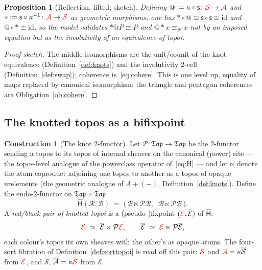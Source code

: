 \documentclass[11pt]{article}
\makeatletter
\newcommand{\Top}{\mathfrak{Top}}
\newcommand{\Ps}{\mathcal{P}}
\newcommand{\sH}{\widehat{\mathsf{H}}}
\newcommand{\swap}{\mathsf{s}}
\newcommand{\id}{\mathrm{id}}
\newcommand{\bEs}{\overline{\mathcal{E}}}
\newcommand{\quo}[1]{@#1}
\newcommand{\drf}[1]{{*}#1}
\newcommand{\rc}[1]{\textcolor{redcopy}{#1}}   %
\newcommand{\Es}{\rc{\mathcal{E}}}             %
\newcommand{\St}{\rc{\mathcal S}}
\newcommand{\At}{\rc{\mathcal A}}
\newcommand{\bSt}{\overline{\mathcal S}}
\newcommand{\bAt}{\overline{\mathcal A}}
\theoremstyle{plain}
\newtheorem{proposition}[theorem]{Proposition}
\theoremstyle{definition}
\newtheorem{construction}[theorem]{Construction}
\theoremstyle{remark}
\makeatother
\begin{document}
\begin{proposition}[Reflection, lifted; sketch]\label{prop:reflift}
Defining $\quo{}:=\kappa\circ\swap\colon\St\to\At$ and $\drf{}:=\swap\circ\kappa^{-1}\colon\At\to\St$
as geometric morphisms, one has $\drf{}\circ\quo{}\cong\swap\circ\swap\cong\id$ and
$\quo{}\circ\drf{}\cong\id$, so the model validates $\drf{}\quo{}P\equiv P$ and $\quo{}\drf{}x\equiv_N
x$ not by an imposed equation but as the involutivity of an equivalence of topoi.
\end{proposition}

\begin{proof}[Proof sketch]
The middle isomorphisms are the unit/counit of the knot equivalence (Definition~\ref{def:knots}) and
the involutivity $2$-cell (Definition~\ref{def:swap}); coherence is~\eqref{eq:cohere}. This is
\cite[Prop.~6]{knotrho} one level up, equality of maps replaced by canonical isomorphism; the triangle
and pentagon coherences are Obligation~\ref{ob:cohere}.
\end{proof}

\subsection{The knotted topos as a bifixpoint}

\begin{construction}[The knot $2$-functor]\label{con:knot2}
Let $\Ps\colon\Top\to\Top$ be the $2$-functor sending a topos to its topos of internal sheaves on the
canonical (power) site --- the topos-level analogue of the powerclass operator of~\eqref{eq:H}
\cite{jm,maclane} --- and let $\ltimes$ denote the atom-coproduct adjoining one topos to another as a
topos of opaque urelements (the geometric analogue of $A+(-)$, Definition~\ref{def:knots}). Define the
endo-$2$-functor on $\Top\times\Top$
\begin{equation}\label{eq:H2}
\sH(\mathcal R,\mathcal B)\;=\;\bigl(\,\mathcal B\ltimes\Ps\mathcal R,\;\;\mathcal R\ltimes\Ps\mathcal B\,\bigr).
\end{equation}
A \emph{red/black pair of knotted topoi} is a (pseudo-)fixpoint $(\Es,\bEs)$ of $\sH$:
\[
\Es\ \simeq\ \bEs\ltimes\Ps\Es,\qquad \bEs\ \simeq\ \Es\ltimes\Ps\bEs,
\]
each colour's topos its own sheaves with the other's as opaque atoms. The four-sort fibration of
Definition~\ref{def:sorttopoi} is read off this pair: $\St$ and $\At=\kappa\bSt$ from $\Es$, and
$\bSt$, $\bAt=\overline\kappa\St$ from $\bEs$.
\end{construction}
\end{document}
